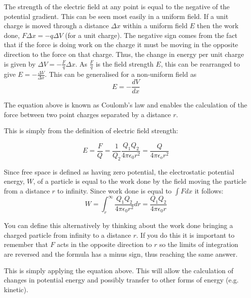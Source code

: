 \documentclass[revision-guide.tex]{subfiles}
\begin{document}

The strength of the electric field at any point is equal to the negative of the potential gradient. This can be seen most easily in a uniform field. If a unit charge is moved through a distance $\Delta x$ within a uniform field $E$ then the work done, $F\Delta x = -q\Delta V$ (for a unit charge). The negative sign comes from the fact that if the force is doing work on the charge it must be moving in the opposite direction to the force on that charge. Thus, the change in energy per unit charge is given by $\Delta V = -\frac{F}{q}\Delta x$. As $\frac{F}{q}$ is the field strength $E$, this can be rearranged to give $E = -\frac{\Delta V}{\Delta x}$. This can be generalised for a non-uniform field as
\[ E = - \frac{dV}{dx} \]


The equation above is known as Coulomb's law and enables the calculation of the force between two point charges separated by a distance $r$.


This is simply from the definition of electric field strength:

\[ E = \frac{F}{Q} = \frac{1}{Q_2} \frac{Q_1 Q_2}{4\pi\epsilon_0 r^2} = \frac{Q}{4\pi\epsilon_o r^2} \]


Since free space is defined as having zero potential, the electrostatic potential energy, $W$, of a particle is equal to the work done by the field moving the particle from a distance $r$ to infinity. Since work done is equal to $\int F dx$ it follows:
\[ W = \int_{r}^\infty \frac{Q_1 Q_2}{4\pi\epsilon_0 r^2} dr = \frac{Q_1 Q_2}{4\pi\epsilon_0 r}\]

You can define this alternatively by thinking about the work done bringing a charged particle from infinity to a distance $r$. If you do this it is important to remember that $F$ acts in the opposite direction to $r$ so the limits of integration are reversed and the formula has a minus sign, thus reaching the same answer.


This is simply applying the equation above. This will allow the calculation of changes in potential energy and possibly transfer to other forms of energy (e.g. kinetic).
\end{document}
